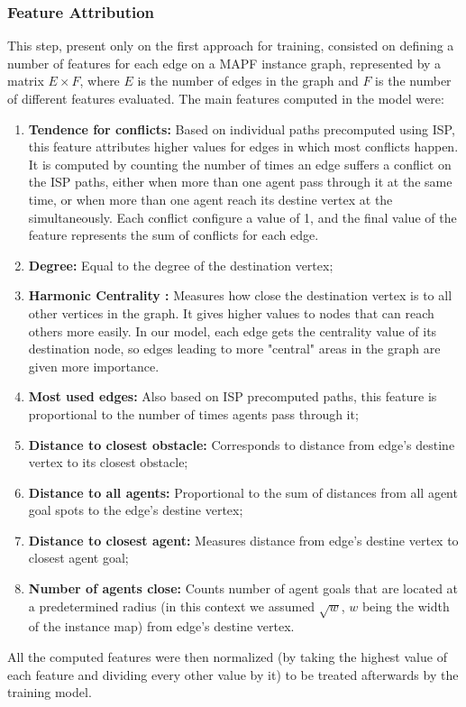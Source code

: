 \subsubsection{Feature Attribution}
This step, present only on the first approach for training, consisted on defining a number of features for each edge on a MAPF instance graph, represented by a matrix $E \times F$, where $E$ is the number of edges in the graph and $F$ is the number of different features evaluated. 
The main features computed in the model were:
\begin{enumerate}
    \item \textbf{Tendence for conflicts:} Based on individual paths precomputed using ISP, this feature attributes higher values for edges in which most conflicts happen. It is computed by counting the number of times an edge suffers a conflict on the ISP paths, either when more than one agent pass through it at the same time, or when more than one agent reach its destine vertex at the simultaneously. Each conflict configure a value of 1, and the final value of the feature represents the sum of conflicts for each edge.
    \item \textbf{Degree:} Equal to the degree of the destination vertex;
    \item \textbf{Harmonic Centrality \cite{Centrality2025}:} Measures how close the destination vertex is to all other vertices in the graph. It gives higher values to nodes that can reach others more easily. In our model, each edge gets the centrality value of its destination node, so edges leading to more "central" areas in the graph are given more importance.
    \item \textbf{Most used edges:} Also based on ISP precomputed paths, this feature is proportional to the number of times agents pass through it;
    \item \textbf{Distance to closest obstacle:} Corresponds to distance from edge's destine vertex to its closest obstacle;
    \item \textbf{Distance to all agents:} Proportional to the sum of distances from all agent goal spots to the edge's destine vertex;
    \item \textbf{Distance to closest agent:} Measures distance from edge's destine vertex to closest agent goal;
    \item \textbf{Number of agents close:} Counts number of agent goals that are located at a predetermined radius (in this context we assumed $\sqrt{w}$, $w$ being the width of the instance map) from edge's destine vertex.
\end{enumerate}
All the computed features were then normalized (by taking the highest value of each feature and dividing every other value by it) to be treated afterwards by the training model.

